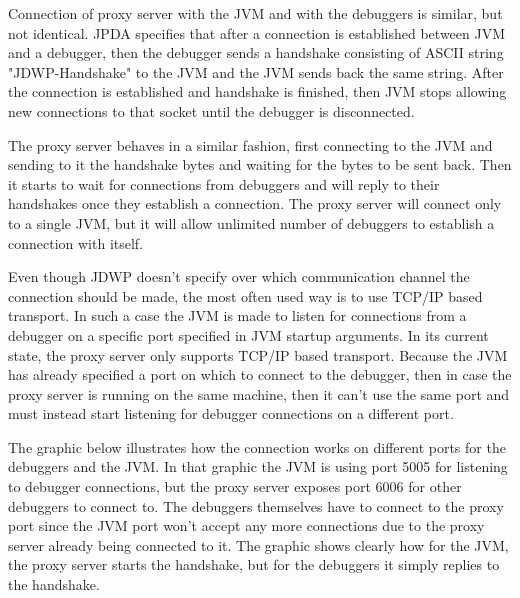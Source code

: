 \documentclass[..thesis.tex]{subfiles}
\begin{document}
Connection of proxy server with the JVM and with the debuggers is similar, but not identical.
JPDA specifies that after a connection is established between JVM and a debugger, then the debugger sends a handshake consisting of ASCII string "JDWP-Handshake" to the JVM and the JVM sends back the same string.
After the connection is established and handshake is finished, then JVM stops allowing new connections to that socket until the debugger is disconnected.

The proxy server behaves in a similar fashion, first connecting to the JVM and sending to it the handshake bytes and waiting for the bytes to be sent back.
Then it starts to wait for connections from debuggers and will reply to their handshakes once they establish a connection.
The proxy server will connect only to a single JVM, but it will allow unlimited number of debuggers to establish a connection with itself.

Even though JDWP doesn't specify over which communication channel the connection should be made, the most often used way is to use TCP/IP based transport.
In such a case the JVM is made to listen for connections from a debugger on a specific port specified in JVM startup arguments.
In its current state, the proxy server only supports TCP/IP based transport.
Because the JVM has already specified a port on which to connect to the debugger, then in case the proxy server is running on the same machine, then it can't use the same port and must instead start listening for debugger connections on a different port.

The graphic below illustrates how the connection works on different ports for the debuggers and the JVM.
In that graphic the JVM is using port 5005 for listening to debugger connections, but the proxy server exposes port 6006 for other debuggers to connect to.
The debuggers themselves have to connect to the proxy port since the JVM port won't accept any more connections due to the proxy server already being connected to it.
The graphic shows clearly how for the JVM, the proxy server starts the handshake, but for the debuggers it simply replies to the handshake.


\end{document}

